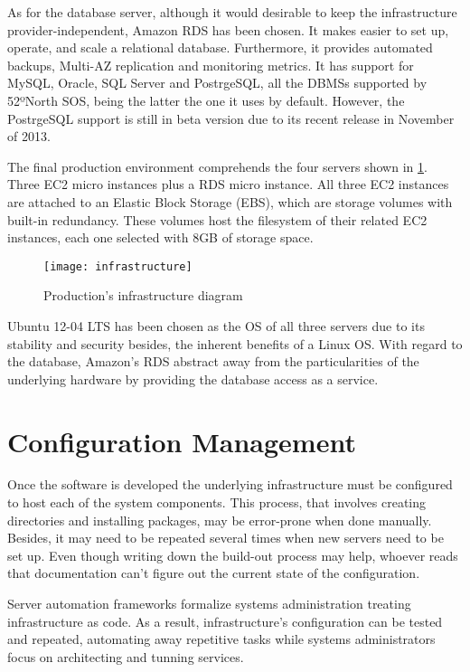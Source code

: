 As for the database server, although it would desirable to keep the infrastructure provider-independent, Amazon RDS has been chosen. It makes easier to set up, operate, and scale a relational database. Furthermore, it provides automated backups, Multi-AZ replication and monitoring metrics. It has support for MySQL, Oracle, SQL Server and PostrgeSQL, all the DBMSs supported by 52ºNorth SOS, being the latter the one it uses by default. However, the PostrgeSQL support is still in beta version due to its recent release in November of 2013.

The final production environment comprehends the four servers shown in \ref{fig:infrastructure}. Three EC2 micro instances plus a RDS micro instance. All three EC2 instances are attached to an Elastic Block Storage (EBS), which are storage volumes with built-in redundancy. These volumes host the filesystem of their related EC2 instances, each one selected with 8GB of storage space.

\begin{figure}
  \centering
  \texttt{[image: infrastructure]}
  \caption{Production's infrastructure diagram}
  \label{fig:infrastructure}
\end{figure}

Ubuntu 12-04 LTS has been chosen as the OS of all three servers due to its stability and security besides, the inherent benefits of a Linux OS. With regard to the database, Amazon's RDS abstract away from the particularities of the underlying hardware by providing the database access as a service.

\section{Configuration Management}

Once the software is developed the underlying infrastructure must be configured to host each of the system components. This process, that involves creating directories and installing packages, may be error-prone when done manually. Besides, it may need to be repeated several times when new servers need to be set up. Even though writing down the build-out process may help, whoever reads that documentation can't figure out the current state of the configuration.

Server automation frameworks formalize systems administration treating infrastructure as code. As a result, infrastructure's configuration can be tested and repeated, automating away repetitive tasks while systems administrators focus on architecting and tunning services.

